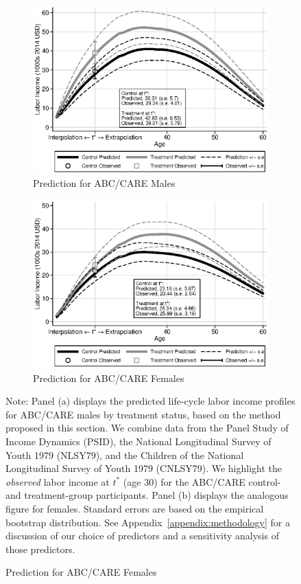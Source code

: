 \begin{figure}
\centering
\caption{Labor Income Profile Predictions}\label{fig:labor-income-profiles}
\begin{subfigure}[h]{0.5\textwidth}
		\centering
		\caption{Prediction for ABC/CARE Males} \label{fig:labor-income-profilesc}
		\includegraphics[width=\textwidth]{output/labor_25-65_pset1_mset3_male.eps}
\end{subfigure}%
\begin{subfigure}[h]{0.5\textwidth}
		\centering
		\caption{Prediction for ABC/CARE Females} \label{fig:labor-income-profilesa}
		\includegraphics[width=\textwidth]{output/labor_25-65_pset1_mset3_female.eps}
\end{subfigure}
\footnotesize \justify
Note: Panel (a) displays the predicted life-cycle labor income profiles for ABC/CARE males by treatment status, based on the method proposed in this section. We combine data from the Panel Study of Income Dynamics (PSID), the National Longitudinal Survey of Youth 1979 (NLSY79), and the Children of the National Longitudinal Survey of Youth 1979 (CNLSY79). We highlight the \textit{observed} labor income at $t^*$ (age 30) for the ABC/CARE control- and treatment-group participants. Panel (b) displays the analogous figure for females. Standard errors are based on the empirical bootstrap distribution.  See Appendix~\ref{appendix:methodology} for a discussion of our choice of predictors and a sensitivity analysis of those predictors.
\end{figure}

